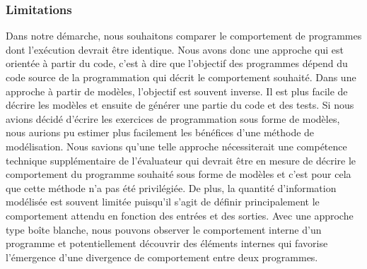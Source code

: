 %
%

\subsubsection*{Limitations}
Dans notre démarche, nous souhaitons comparer le comportement de programmes dont l'exécution devrait être identique. Nous avons donc une approche qui est orientée à partir du code, c'est à dire que l'objectif des programmes dépend du code source de la programmation qui décrit le comportement souhaité. 
Dans une approche à partir de modèles, l'objectif est souvent inverse. Il est plus facile de décrire les modèles et ensuite de générer une partie du code et des tests.
Si nous avions décidé d'écrire les exercices de programmation sous forme de modèles, nous aurions pu estimer plus facilement les bénéfices d'une méthode de modélisation. Nous savions qu'une telle approche nécessiterait une compétence technique supplémentaire de l'évaluateur qui devrait être en mesure de décrire le comportement du programme souhaité sous forme de modèles et c'est pour cela que cette méthode n'a pas été privilégiée.
De plus, la quantité d'information modélisée est souvent limitée puisqu'il s'agit de définir principalement le comportement attendu en fonction des entrées et des sorties. Avec une approche type boîte blanche, nous pouvons observer le comportement interne d'un programme et potentiellement découvrir des éléments internes qui favorise l'émergence d'une divergence de comportement entre deux programmes.

